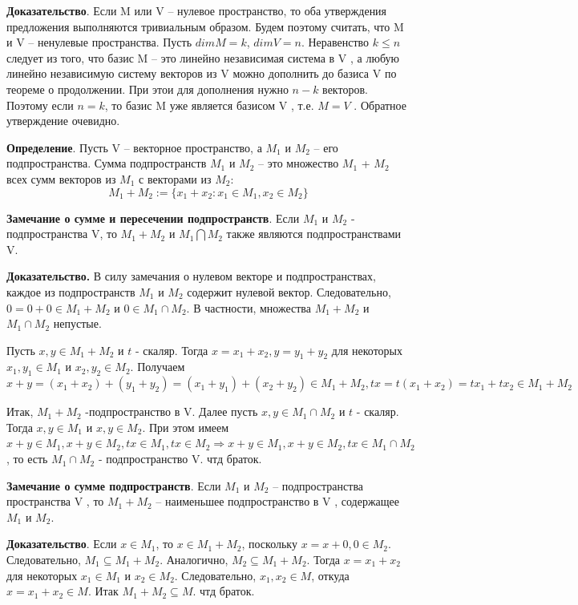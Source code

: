 \documentclass[a4paper]{article}
\begin{document}
\textbf{Доказательство}. Если M или V – нулевое пространство, то оба
утверждения предложения выполняются тривиальным образом. Будем
поэтому считать, что M и V – ненулевые пространства. Пусть $dim M = k$,
$dim V = n$. Неравенство $k \leq n$ следует из того, что базис M – это линейно
независимая система в V , а любую линейно независимую систему
векторов из V можно дополнить до базиса V по теореме о продолжении. При этои для дополнения нужно $n-k$ векторов. Поэтому если $n=k$, то базис M уже является базисом V , т.е. $M = V$ . Обратное утверждение очевидно.

\textbf{Определение}. Пусть V – векторное пространство, а $M_1$ и $M_2$ – его подпространства.
Сумма подпространств $M_1$ и $M_2$ – это множество $M_1$ + $M_2$ всех сумм
векторов из $M_1$ с векторами из $M_2$:
\begin{equation}
M_1+M_2 := \{ x_1 + x_2: x_1 \in M_1, x_2 \in M_2 \}
\end{equation}

\textbf{Замечание о сумме и пересечении подпространств}. Если $M_1$ и $M_2$ - подпространства V, то $M_1+M_2$ и $M_1 \bigcap M_2$ также являются подпространствами V.

\textbf{Доказательство.} В силу замечания о нулевом векторе и подпространствах,
каждое из подпространств $M_1$ и $M_2$ содержит нулевой вектор. Следовательно, $0=0+0 \in M_1+M_2$ и $0 \in M_1 \cap M_2$. В частности, множества $M_1+M_2$ и $M_1 \cap M_2$ непустые.

Пусть $x, y \in M_1+M_2$ и $t$ - скаляр. Тогда $x=x_1+x_2, y=y_1+y_2$ для некоторых $x_1, y_1 \in M_1$ и $x_2, y_2 \in M_2$. Получаем \begin{equation}
x+y = (x_1+x_2) + (y_1+y_2) = (x_1+y_1)+(x_2+y_2) \in M_1 + M_2, tx = t(x_1 + x_2) = tx_1 + tx_2 \in M_1 + M_2
\end{equation}

Итак, $M_1+M_2$ -подпространство в V. Далее пусть $x, y \in M_1 \cap M_2$ и $t$ - скаляр. Тогда $x, y \in M_1$ и $x, y \in M_2$. При этом имеем $x+y \in M_1, x+y \in M_2, tx \in M_1, tx \in M_2 \Rightarrow x+y \in M_1, x+y \in M_2, tx \in M_1 \cap M_2$, то есть $M_1 \cap M_2$ - подпространство V. чтд браток.

\textbf{Замечание о сумме подпространств}. Если $M_1$ и $M_2$ – подпространства пространства V , то $M_1 + M_2$ –
наименьшее подпространство в V , содержащее $M_1$ и $M_2$.

\textbf{Доказательство}. Если $x \in M_1$, то $x \in M_1 + M_2$, поскольку $x = x + 0, 0 \in M_2$. Следовательно, $M_1 \subseteq M_1 + M_2$. Аналогично, $M_2 \subseteq M_1 + M_2$. Тогда $x = x_1 + x_2$ для некоторых $x_1 \in M_1$ и $x_2 \in M_2$. Следовательно, $x_1, x_2 \in M$, откуда $x=x_1+x_2 \in M$. Итак $M_1 + M_2 \subseteq M$. чтд браток.
\end{document}
